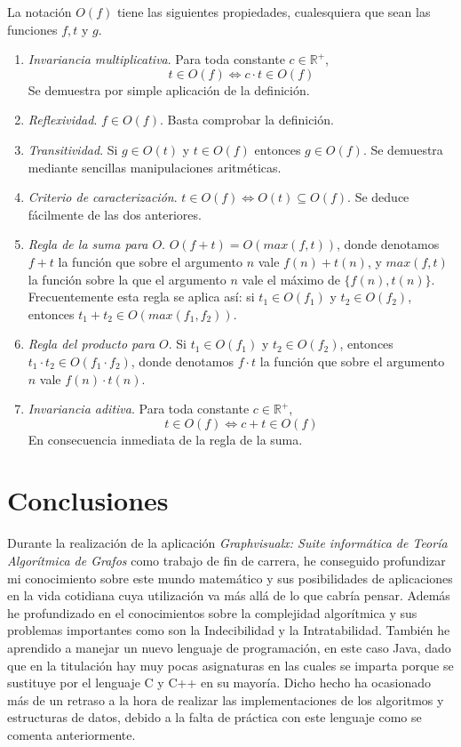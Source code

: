 \documentclass[a4paper,12pt]{article}
\begin{document}
La notación $O(f)$ tiene las siguientes propiedades, cualesquiera que sean las funciones $f,t$ y $g$.\\
\begin{enumerate}
\item \emph{Invariancia multiplicativa}. Para toda constante $c \in \mathbb{R}^+$,
\[ t \in O(f) \iff c \cdot t \in O(f) \]
Se demuestra por simple aplicación de la definición.
\item \emph{Reflexividad}. $f \in O(f)$. Basta comprobar la definición.
\item \emph{Transitividad}. Si $g \in O(t)$ y $t \in O(f)$ entonces $g \in O(f)$. Se demuestra mediante sencillas manipulaciones aritméticas.
\item \emph{Criterio de caracterización}. $t \in O(f) \iff O(t) \subseteq O(f)$. Se deduce fácilmente de las dos anteriores.
\item \emph{Regla de la suma para $O$}. $O(f+t) = O(max(f,t))$, donde denotamos $f+t$ la función que sobre el argumento $n$ vale $f(n)+t(n)$, y $max(f,t)$ la función sobre la que el argumento $n$ vale el máximo de $\{f(n),t(n)\}$. Frecuentemente esta regla se aplica así: si $t_1 \in O(f_1)$ y $t_2 \in O(f_2)$, entonces $t_1 + t_2 \in O(max(f_1,f_2))$.
\item \emph{Regla del producto para $O$}. Si $t_1 \in O(f_1)$ y $t_2 \in O(f_2)$, entonces $t_1 \cdot t_2 \in O(f_1 \cdot f_2)$, donde denotamos $f \cdot t$ la función que sobre el argumento $n$ vale $f(n) \cdot t(n)$.
\item \emph{Invariancia aditiva}. Para toda constante $c \in \mathbb{R}^{+}$,
\[ t \in O(f) \iff c + t \in O(f) \]
En consecuencia inmediata de la regla de la suma.
\end{enumerate}

\section{Conclusiones}

Durante la realización de la aplicación \emph{Graphvisualx: Suite informática de Teoría Algorítmica de Grafos} como trabajo de fin de carrera, he conseguido profundizar mi conocimiento sobre este mundo matemático y sus posibilidades de aplicaciones en la vida cotidiana cuya utilización va más allá de lo que cabría pensar. Además he profundizado en el conocimientos sobre la complejidad algorítmica y sus problemas importantes como son la Indecibilidad y la Intratabilidad. También he aprendido a manejar un nuevo lenguaje de programación, en este caso Java, dado que en la titulación hay muy pocas asignaturas en las cuales se imparta porque se sustituye por el lenguaje C y C++ en su mayoría. Dicho hecho ha ocasionado más de un retraso a la hora de realizar las implementaciones de los algoritmos y estructuras de datos, debido a la falta de práctica con este lenguaje como se comenta anteriormente.\\
\end{document}
